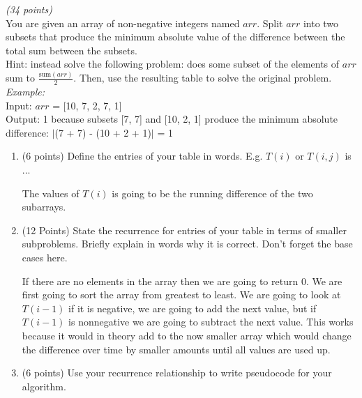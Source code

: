 \documentclass{article}
\newcounter{ProblemCounter}
\newenvironment{problem}[1][Problem]{
 \begin{trivlist}
 \item[\hskip \labelsep {\bfseries #1}\hskip \labelsep {%
 \bfseries \theProblemCounter.%
 \stepcounter{ProblemCounter}%
 }]
}{
 \end{trivlist}
}
\begin{document}
\begin{problem}\textit{(34 points)}\\
You are given an array of non-negative integers named $arr$. Split $arr$ into two subsets that produce the minimum absolute value of the difference between the total sum between the subsets.\\

\noindent Hint: instead solve the following problem: does some subset of the elements of $arr$ sum to $\frac{\text{sum}(arr)}{2}$. Then, use the resulting table to solve the original problem.\\

\noindent \textit{Example:}\\
Input: $arr$ = [10, 7, 2, 7, 1]\\
Output: 1 because subsets [7, 7] and [10, 2, 1] produce the minimum absolute difference: $|$(7 + 7) - (10 + 2 + 1)$|$ = 1


\begin{enumerate}[label=\textbf{\alph*.)}]
    \item (6 points) Define the entries of your table in words. E.g. $T(i)$ or $T(i, j)$ is ...
    
    The values of $T(i)$ is going to be the running difference of the two subarrays. 
    
    \item (12 Points) State the recurrence for entries of your table in terms of smaller subproblems. Briefly explain in words why it is correct. Don't forget the base cases here.
    
    If there are no elements in the array then we are going to return $0$. We are first going to sort the array from greatest to least. We are going to look at $T(i-1)$ if it is negative, we are going to add the next value, but if $T(i-1)$ is nonnegative we are going to subtract the next value. This works because it would in theory add to the now smaller array which would change the difference over time by smaller amounts until all values are used up.
    
    \item (6 points) Use your recurrence relationship to write pseudocode for your algorithm.
    
    \begin{algorithm}[H]
    \end{algorithm}
    

\end{enumerate}
\end{problem}
\end{document}
